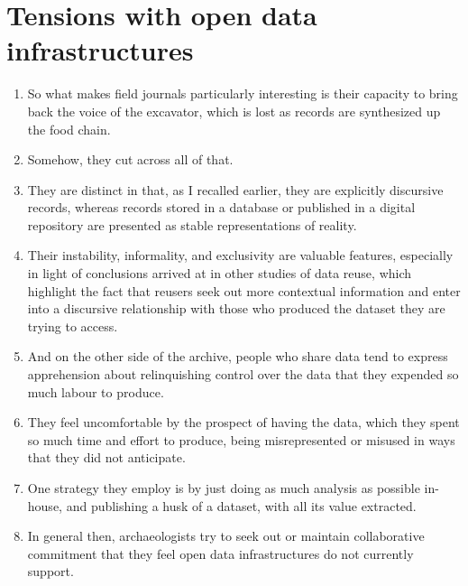 \documentclass[12pt]{article}
\begin{document}
\section{Tensions with open data infrastructures}
\begin{enumerate}
  \item So what makes field journals particularly interesting is their capacity to bring back the voice of the excavator, which is lost as records are synthesized up the food chain.
  \item Somehow, they cut across all of that.
  \item They are distinct in that, as I recalled earlier, they are explicitly discursive records, whereas records stored in a database or published in a digital repository are presented as stable representations of reality.
  \item Their instability, informality, and exclusivity are valuable features, especially in light of conclusions arrived at in other studies of data reuse, which highlight the fact that reusers seek out more contextual information and enter into a discursive relationship with those who produced the dataset they are trying to access.
  \item And on the other side of the archive, people who share data tend to express apprehension about relinquishing control over the data that they expended so much labour to produce.
  \item They feel uncomfortable by the prospect of having the data, which they spent so much time and effort to produce, being misrepresented or misused in ways that they did not anticipate.
  \item One strategy they employ is by just doing as much analysis as possible in-house, and publishing a husk of a dataset, with all its value extracted.
  \item In general then, archaeologists try to seek out or maintain collaborative commitment that they feel open data infrastructures do not currently support.
\end{enumerate}
\end{document}
